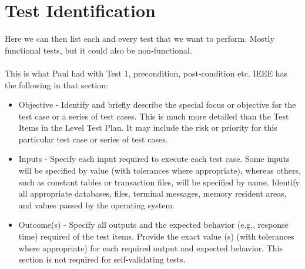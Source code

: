 \section{Test Identification}

Here we can then list each and every test that we want to perform. Mostly functional tests, but it could also be non-functional.\\\\

This is what Paul had with Test 1, precondition, post-condition etc. IEEE has the following in that section:
\begin{itemize}
	\item  Objective - Identify and briefly describe the special focus or objective for the test case or a series of test cases.
This is much more detailed than the Test Items in the Level Test Plan. It may include the risk or priority for this particular test case or series of test cases.
	\item  Inputs - Specify each input required to execute each test case. Some inputs will be specified by value (with
tolerances where appropriate), whereas others, such as constant tables or transaction files, will be
specified by name. Identify all appropriate databases, files, terminal messages, memory resident areas,
and values passed by the operating system.
	\item  Outcome(s) - Specify all outputs and the expected behavior (e.g., response time) required of the test items. Provide
the exact value (s) (with tolerances where appropriate) for each required output and expected behavior.
This section is not required for self-validating tests.
\end{itemize}

